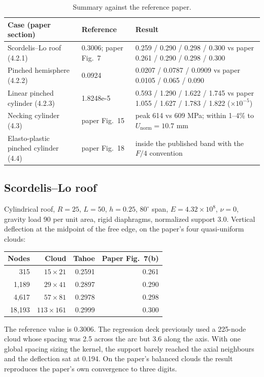 \documentclass[11pt,a4paper]{article}
\begin{document}
\begin{table}[h]
\centering\small
\caption{Summary against the reference paper.}\label{tab:summary}
\begin{tabular}{@{}lll@{}}
\toprule
Case (paper section) & Reference & Result \\
\midrule
Scordelis--Lo roof (4.2.1) & 0.3006; paper Fig.~7 & 0.259 / 0.290 / 0.298 / 0.300 vs paper 0.261 / 0.290 / 0.298 / 0.300 \\
Pinched hemisphere (4.2.2) & 0.0924 & 0.0207 / 0.0787 / 0.0909 vs paper 0.0105 / 0.065 / 0.090 \\
Linear pinched cylinder (4.2.3) & 1.8248e-5 & 0.593 / 1.290 / 1.622 / 1.745 vs paper 1.055 / 1.627 / 1.783 / 1.822 ($\times10^{-5}$) \\
Necking cylinder (4.3) & paper Fig.~15 & peak 614 vs 609 MPa; within 1--4\% to $U_{\mathrm{norm}}=10.7$ mm \\
Elasto-plastic pinched cylinder (4.4) & paper Fig.~18 & inside the published band with the $F/4$ convention \\
\bottomrule
\end{tabular}
\end{table}

\subsection{Scordelis--Lo roof}\label{sec:scordelis}
Cylindrical roof, $R=25$, $L=50$, $h=0.25$, $80^\circ$ span, $E=4.32\times10^8$, $\nu=0$, gravity
load 90 per unit area, rigid diaphragms, normalized support 3.0. Vertical deflection at the
midpoint of the free edge, on the paper's four quasi-uniform clouds:

\begin{table}[h]
\centering\small
\begin{tabular}{@{}rrrr@{}}
\toprule
Nodes & Cloud & Tahoe & Paper Fig.~7(b) \\
\midrule
315 & $15\times21$ & 0.2591 & 0.261 \\
1{,}189 & $29\times41$ & 0.2897 & 0.290 \\
4{,}617 & $57\times81$ & 0.2978 & 0.298 \\
18{,}193 & $113\times161$ & 0.2999 & 0.300 \\
\bottomrule
\end{tabular}
\end{table}

The reference value is 0.3006. The regression deck previously used a 225-node cloud whose spacing
was 2.5 across the arc but 3.6 along the axis. With one global spacing sizing the kernel, the
support barely reached the axial neighbours and the deflection sat at 0.194. On the paper's
balanced clouds the result reproduces the paper's own convergence to three digits.
\end{document}
